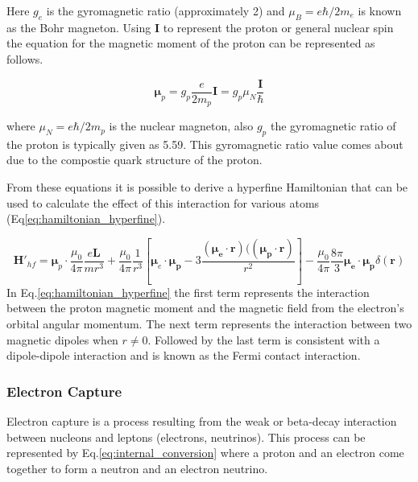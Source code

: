 \documentclass[jon_ringuette_thesis.tex]{subfiles}
\begin{document}
    Here $g_e$ is the gyromagnetic ratio (approximately 2) and $\mu_B = e\hbar / 2m_e$ is known as the Bohr magneton. Using $\mathbf{I}$ to represent the proton or general nuclear spin the equation for the magnetic moment of the proton can be represented as follows.

    \begin{equation}
        \mathbf{\mu}_p = g_p \frac{e}{2m_p}\mathbf{I} = g_p \mu_{N} \frac{\mathbf{I}}{\hbar}
        \label{eq:proton_spin_b_moment}
    \end{equation}

    where $\mu_N = e\hbar/2m_p$ is the nuclear magneton, also $g_p$ the gyromagnetic ratio of the proton is typically given as 5.59. This gyromagnetic ratio value comes about due to the compostie quark structure of the proton.

    From these equations it is possible to derive a hyperfine Hamiltonian that can be used to calculate the effect of this interaction for various atoms (Eq\ref{eq:hamiltonian_hyperfine}).

    \begin{equation}
        \mathbf{H'}_{hf} = \mathbf{\mu}_p \cdot \frac{\mu_{0}}{4\pi} \frac{e\mathbf{L}}{mr^3} +
        \frac{\mu_0}{4\pi} \frac{1}{r^3} \left[ \mathbf{\mu}_e \cdot \mathbf{\mu_p} -
        3 \frac{(\mathbf{\mu_e} \cdot \mathbf{r})((\mathbf{\mu_p} \cdot \mathbf{r})}{r^2} \right] -
        \frac{\mu_0}{4\pi} \frac{8\pi}{3} \mathbf{\mu_e} \cdot \mathbf{\mu_p} \delta(\mathbf{r})
        \label{eq:hamiltonian_hyperfine}
    \end{equation}
    In Eq.\ref{eq:hamiltonian_hyperfine} the first term represents the interaction between the proton magnetic moment and the magnetic field from the electron's orbital angular momentum. The next term represents the interaction between two magnetic dipoles when $r \ne 0$. Followed by the last term is consistent with a dipole-dipole interaction and is known as the Fermi contact interaction.

    \subsubsection{Electron Capture}
    Electron capture is a process resulting from the weak or beta-decay interaction between nucleons and leptons (electrons, neutrinos). This process can be represented by Eq.\ref{eq:internal_conversion} where a proton and an electron come together to form a neutron and an electron neutrino. \cite{crasemann}
\end{document}
